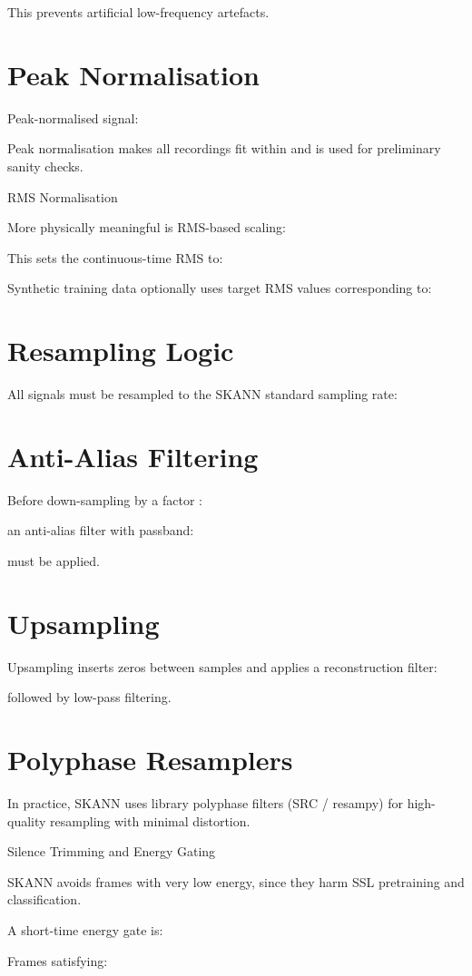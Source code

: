 \documentclass[12pt]{article}
\begin{document}
This prevents artificial low-frequency artefacts.

\section*{Peak Normalisation}
Peak-normalised signal:


Peak normalisation makes all recordings fit within  and is used for preliminary sanity checks.

RMS Normalisation

More physically meaningful is RMS-based scaling:


This sets the continuous-time RMS to:


Synthetic training data optionally uses target RMS values corresponding to:


\section*{Resampling Logic}
All signals must be resampled to the SKANN standard sampling rate:


\section*{Anti-Alias Filtering}
Before down-sampling by a factor :


an anti-alias filter with passband:


must be applied.

\section*{Upsampling}
Upsampling inserts zeros between samples and applies a reconstruction filter:


followed by low-pass filtering.

\section*{Polyphase Resamplers}
In practice, SKANN uses library polyphase filters (SRC / resampy) for high-quality resampling with minimal distortion.

Silence Trimming and Energy Gating

SKANN avoids frames with very low energy, since they harm SSL pretraining and classification.

A short-time energy gate is:


Frames satisfying:
\end{document}
